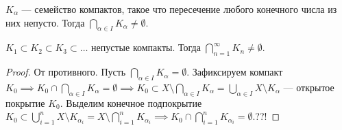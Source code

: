 \begin{theorem}
    $K_\alpha$ --- семейство компактов, такое что пересечение любого конечного числа из них непусто. Тогда  $\bigcap_{\alpha \in I} K_\alpha \neq \emptyset$.
\end{theorem}
\begin{consequence}
    $K_1 \subset K_2 \subset K_3 \subset \ldots$ непустые компакты. Тогда $\bigcap\limits_{n=1}^\infty K_n \neq \emptyset$.
\end{consequence}
\begin{proof}
    От противного. Пусть $\bigcap\limits_{\alpha \in I} K_\alpha = \emptyset$. Зафиксируем компакт  $K_0 \implies K_0 \cap \bigcap\limits_{\alpha \in I} K_\alpha = \emptyset \implies K_0 \subset X \setminus \bigcap\limits_{\alpha \in I} K_\alpha = \bigcup_{\alpha \in I} X \setminus K_\alpha$ --- открытое покрытие  $K_0$. Выделим конечное подпокрытие  $K_0 \subset \bigcup\limits_{i=1}^n X \setminus K_{\alpha_i} = X \setminus \bigcap\limits_{i=1}^n K_{\alpha_i} \implies K_0 \cap \bigcap\limits_{i=1}^n K_{\alpha_i} = \emptyset$.??!
\end{proof}

